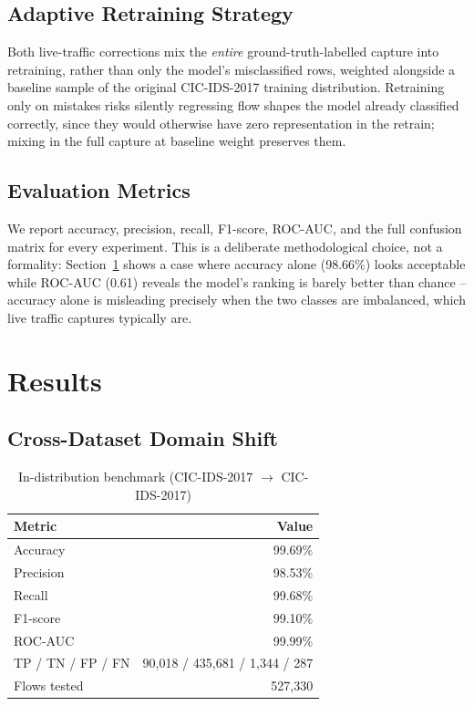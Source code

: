 \documentclass[conference]{IEEEtran}
\begin{document}
\subsection{Adaptive Retraining Strategy}
Both live-traffic corrections mix the \emph{entire} ground-truth-labelled
capture into retraining, rather than only the model's misclassified rows,
weighted alongside a baseline sample of the original CIC-IDS-2017
training distribution. Retraining only on mistakes risks silently
regressing flow shapes the model already classified correctly, since they
would otherwise have zero representation in the retrain; mixing in the
full capture at baseline weight preserves them.

\subsection{Evaluation Metrics}
We report accuracy, precision, recall, F1-score, ROC-AUC, and the full
confusion matrix for every experiment. This is a deliberate methodological
choice, not a formality: Section~\ref{sec:results} shows a case where
accuracy alone (98.66\%) looks acceptable while ROC-AUC (0.61) reveals the
model's ranking is barely better than chance -- accuracy alone is
misleading precisely when the two classes are imbalanced, which live
traffic captures typically are.

\section{Results}
\label{sec:results}

\subsection{Cross-Dataset Domain Shift}

\begin{table}[t]
\centering
\caption{In-distribution benchmark (CIC-IDS-2017 $\rightarrow$ CIC-IDS-2017)}
\label{tab:table1}
\begin{tabular}{lr}
\toprule
Metric & Value \\
\midrule
Accuracy & 99.69\% \\
Precision & 98.53\% \\
Recall & 99.68\% \\
F1-score & 99.10\% \\
ROC-AUC & 99.99\% \\
TP / TN / FP / FN & 90{,}018 / 435{,}681 / 1{,}344 / 287 \\
Flows tested & 527{,}330 \\
\bottomrule
\end{tabular}
\end{table}
\end{document}
